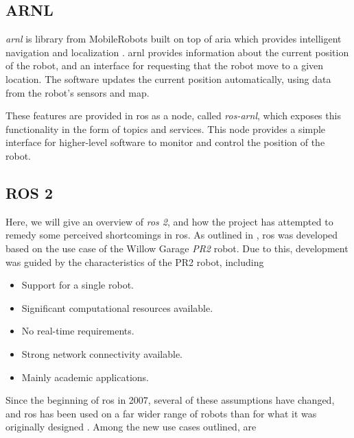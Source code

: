 \documentclass[\rootfolder/main.tex]{subfiles}
\begin{document}
\subsection{ARNL}

\emph{\acrfull{arnl}} is \CC library from MobileRobots built on top of \acrshort{aria} which provides intelligent navigation and localization \cite{ARNL}.
\acrshort{arnl} provides information about the current position of the robot, and an interface for requesting that the robot move to a given location.
The software updates the current position automatically, using data from the robot's sensors and map.

These features are provided in \acrshort{ros} as a node, called \emph{ros-arnl}, which exposes this functionality in the form of topics and services.
This node provides a simple interface for higher-level software to monitor and control the position of the robot.


\subsection{ROS 2}

Here, we will give an overview of \emph{\acrshort{ros} 2}, and how the project has attempted to remedy some perceived shortcomings in \acrshort{ros}.
As outlined in \cite{Gerkey2017}, \acrshort{ros} was developed based on the use case of the Willow Garage \emph{PR2} robot.
Due to this, development was guided by the characteristics of the PR2 robot, including

\begin{itemize}
    \item Support for a single robot.
    \item Significant computational resources available.
    \item No real-time requirements.
    \item Strong network connectivity available.
    \item Mainly academic applications.
\end{itemize}

Since the beginning of \acrshort{ros} in 2007, several of these assumptions have changed, and \acrshort{ros} has been used on a far wider range of robots than for what it was originally designed \cite{Gerkey2017}.
Among the new use cases outlined, are
\end{document}
